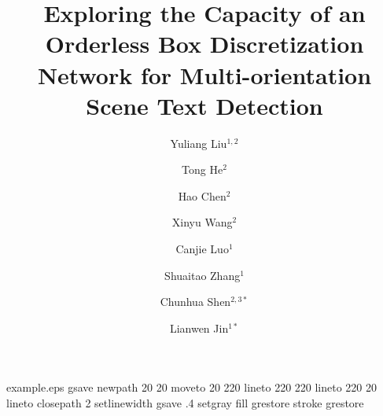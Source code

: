 




\begin{filecontents*}{example.eps}
gsave
newpath
  20 20 moveto
  20 220 lineto
  220 220 lineto
  220 20 lineto
closepath
2 setlinewidth
gsave
  .4 setgray fill
grestore
stroke
grestore
\end{filecontents*}
\RequirePackage{fix-cm}
\documentclass[twocolumn]{svjour3}          \smartqed  

\usepackage{mathptmx}


\usepackage{epsfig}
\usepackage{graphicx}
\usepackage{amsmath}
\usepackage{amssymb}
\usepackage{epstopdf}
\usepackage{makecell,multirow,diagbox}
\usepackage[pagebackref=true,breaklinks=true,letterpaper=true,colorlinks,bookmarks=false,citecolor=blue]{hyperref}
\usepackage{color}
\usepackage{subfigure}
\usepackage{url}

\usepackage{xspace}

\usepackage[numbers,sort]{natbib}
\usepackage{caption}
\captionsetup{margin=0.1pt,font=footnotesize,labelfont=bf}
\setlength{\abovecaptionskip}{4pt}
\setlength{\belowcaptionskip}{2pt}
\hsize=2in 







\def\Orderless{Orderless\xspace}
\def\Ours{{OBD}\xspace}


\def\multioriented{multi-orientation\xspace}
\def\multiorientedB{Multi-orientation\xspace}







\title{Exploring the Capacity of an \Orderless Box Discretization Network for Multi-orientation Scene Text Detection}










\author{
Yuliang Liu$ ^{1,2}$ 
\and
Tong He$ ^2$
\and
Hao Chen$ ^2$
\and
Xinyu Wang$ ^2$
\and
Canjie Luo$ ^1$
\and
Shuaitao Zhang$ ^1$
\and
Chunhua Shen$ ^{2,3*}$
\and
Lianwen Jin$ ^{1*}$
}








